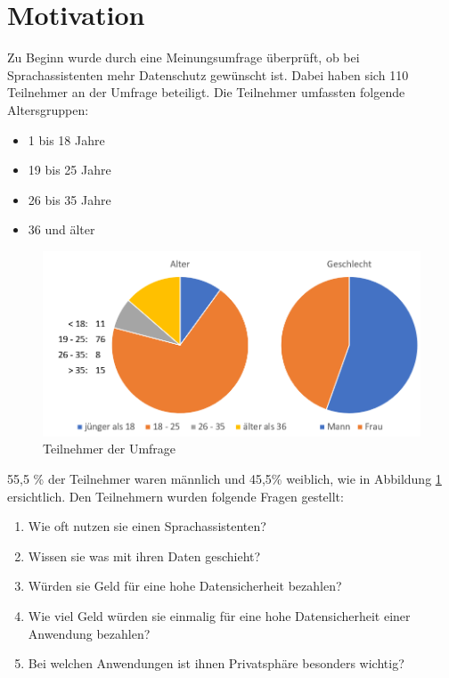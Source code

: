 \section{Motivation}\label{sec:motivaiton}
Zu Beginn wurde durch eine Meinungsumfrage überprüft, ob bei Sprachassistenten mehr Datenschutz gewünscht ist. Dabei haben sich 110 Teilnehmer an der Umfrage beteiligt. Die Teilnehmer umfassten folgende Altersgruppen:
\begin{itemize}
	\item 1 bis 18 Jahre 
	\item 19 bis 25 Jahre
	\item 26 bis 35 Jahre
	\item 36 und älter	
\end{itemize}

\begin{figure}[h]
	\centering
	\includegraphics[width=0.9\linewidth]{Picture/umfrage_teilnehmer}
	\caption[Teilnehmer der Umfrage]{Teilnehmer der Umfrage}
	\label{fig:umfrage_teilnehmer}
\end{figure}

55,5 \% der Teilnehmer waren männlich und 45,5\%  weiblich, wie in Abbildung \ref{fig:umfrage_teilnehmer} ersichtlich. Den Teilnehmern wurden folgende Fragen gestellt:

\begin{enumerate}	
	\item Wie oft nutzen sie einen Sprachassistenten?
	\item Wissen sie was mit ihren Daten geschieht?
	\item Würden sie Geld für eine hohe Datensicherheit bezahlen?
	\item Wie viel Geld würden sie einmalig für eine hohe Datensicherheit einer Anwendung bezahlen?
	\item Bei welchen Anwendungen ist ihnen Privatsphäre besonders wichtig?	
\end{enumerate}

